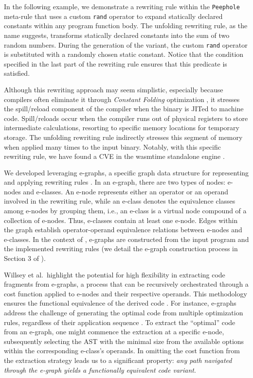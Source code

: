 In the following example, we demonstrate a rewriting rule within the \texttt{Peephole} meta-rule that uses a custom \texttt{rand} operator to expand statically declared constants within any \Wasm program function body. 
The unfolding rewriting rule, as the name suggests, transforms statically declared constants into the sum of two random numbers.
During the generation of the \Wasm variant, the custom \texttt{rand} operator is substituted with a randomly chosen static constant.
Notice that the condition specified in the last part of the rewriting rule ensures that this predicate is satisfied. 




Although this rewriting approach may seem simplistic, especially because compilers often eliminate it through \emph{Constant Folding} optimization \cite{2023arXiv230513241T}, it stresses the spill/reload component of the compiler when the \Wasm binary is JITed to machine code.
Spill/reloads occur when the compiler runs out of physical registers to store intermediate calculations, resorting to specific memory locations for temporary storage. 
The unfolding rewriting rule indirectly stresses this segment of memory when applied many times to the input \Wasm binary. 
Notably, with this specific rewriting rule, we have found a CVE in the wasmtime standalone engine \cite{CVE}.




We developed \tool leveraging e-graphs, a specific graph data structure for representing and applying rewriting rules \cite{10.1145/3571207}. 
In an e-graph, there are two types of nodes: e-nodes and e-classes. 
An e-node represents either an operator or an operand involved in the rewriting rule, while an e-class denotes the equivalence classes among e-nodes by grouping them, i.e., an e-class is a virtual node compound of a collection of e-nodes. 
Thus, e-classes contain at least one e-node.
Edges within the graph establish operator-operand equivalence relations between e-nodes and e-classes.
In the context of \tool, e-graphs are constructed from the input \Wasm program and the implemented rewriting rules (we detail the e-graph construction process in Section 3 of \cite{wasmmutate}).

Willsey et al.~highlight the potential for high flexibility in extracting code fragments from e-graphs, a process that can be recursively orchestrated through a cost function applied to e-nodes and their respective operands.
This methodology ensures the functional equivalence of the derived code \cite{e-graph}. 
For instance, e-graphs address the challenge of generating the optimal code from multiple optimization rules, regardless of their application sequence \cite{10.1145/1480881.1480915}.
To extract the ``optimal'' code from an e-graph, one might commence the extraction at a specific e-node, subsequently selecting the AST with the minimal size from the available options within the corresponding e-class's operands.
In \too omitting the cost function from the extraction strategy leads us to a significant property: \emph{any path navigated through the e-graph yields a functionally equivalent code variant}. 

